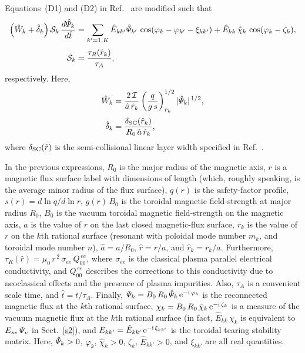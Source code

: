 \documentclass[12pt,prb,aps]{revtex4-1}
\begin{document}
Equations~(D1) and (D2) in Ref.~ are modified such that 
\begin{align}\label{e15}
\left(\hat{W}_k + \hat{\delta}_k\right){\cal S}_k\,\frac{d\hat{\mit\Psi}_k}{d\hat{t}} &= \sum_{k'=1,K}\hat{E}_{kk'}\hat{\mit\Psi}_{k'}\,\cos(\varphi_k-\varphi_{k'}-\xi_{kk'})
+\hat{E}_{kk}\,\hat{\chi}_k\,\cos(\varphi_k-\zeta_k),\\[0.5ex]
{\cal S}_k&=\frac{\tau_R(\hat{r}_k)}{\tau_A},
\end{align}
respectively. Here, 
\begin{align}
\hat{W}_k &=\frac{2\,{\cal I}}{\hat{a}\,\hat{r}_k}\left(\frac{q}{g\,s}\right)_{\hat{r}_k}^{1/2} |\hat{\mit\Psi}_k|^{\,1/2},\\[0.5ex]
\hat{\delta}_k &= \frac{\delta_{\rm SC}(\hat{r}_k)}{R_0\,\hat{a}\,\hat{r}_k},
\end{align}
where $\delta_{\rm SC}(\hat{r})$ is the semi-collisional linear layer width specified in Ref.~.

In the previous expressions, $R_0$ is the major radius of the magnetic axis, $r$ is a magnetic flux surface label with dimensions of length (which, roughly speaking, is the average minor radius of the
flux surface), $q(r)$ is the safety-factor profile, $s(r)=d\ln q/d\ln r$, 
$g(r)\,B_0$ is the toroidal magnetic field-strength at major radius $R_0$, $B_0$ is the vacuum
toroidal magnetic field-strength on the magnetic axis, $a$ is the value of $r$ on the last closed magnetic-flux surface, $r_k$ is the value of $r$ on the $k$th rational
surface (resonant with poloidal mode number $m_k$, and toroidal mode number $n$), $\hat{a}=a/R_0$, $\hat{r}=r/a$, and $\hat{r}_k=r_k/a$. 
Furthermore, $\tau_R(\hat{r})= \mu_0\,r^{\,2}\,\sigma_{ee}\,Q_{00}^{\,ee}$, where $\sigma_{ee}$ is the classical plasma parallel electrical conductivity, and
$Q_{00}^{\,ee}$ describes the corrections to this conductivity due to neoclassical effects and the presence of plasma impurities. Also, $\tau_A$ is a convenient
scale time, and $\hat{t}=t/\tau_A$. Finally, ${\mit\Psi}_k = B_0\,R_0\,\hat{\mit\Psi}_k\,{\rm e}^{-{\rm i}\,\varphi_k}$ is the reconnected magnetic flux
at the $k$th rational surface, ${\mit\chi}_k = B_0\,R_0\,\hat{\mit\chi}_k\,{\rm e}^{-{\rm i}\,\zeta_k}$ is a measure of the vacuum magnetic flux at the $k$th
rational surface (in fact, $\hat{E}_{kk}\,\chi_k$ is equivalent to $E_{sv}\,{\mit\Psi}_v$ in Sect.~\ref{s2}), and $E_{kk'} =\hat{E}_{kk'}\,{\rm e}^{-{\rm i}\,\xi_{kk'}}$ is the toroidal tearing stability matrix.\cite{am1} Here, $\hat{\mit\Psi}_k>0$, $\varphi_k$, $\hat{\chi}_k>0$,
$\zeta_k$, $\hat{E}_{kk'}>0$, and $\xi_{kk'}$ are all real quantities.
\end{document}
